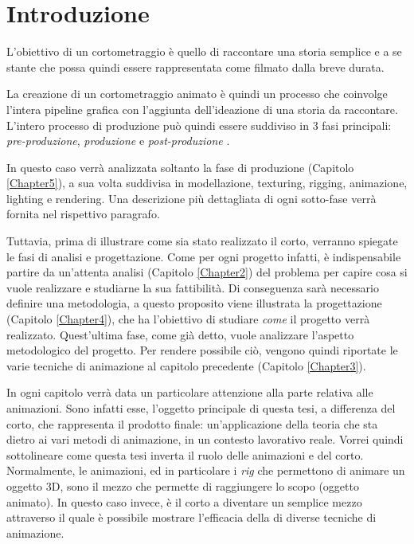 
\chapter{Introduzione} %

\label{Chapter1} %

L'obiettivo di un cortometraggio è quello di raccontare una storia semplice e a se stante che possa quindi essere rappresentata come filmato dalla breve durata.

La creazione di un cortometraggio animato è quindi un processo che coinvolge l'intera pipeline grafica con l'aggiunta dell'ideazione di una storia da raccontare. L'intero processo di produzione può quindi essere suddiviso in 3 fasi principali: \emph{pre-produzione}, \emph{produzione} e \emph{post-produzione} \parencite{roy2014finish}.

In questo caso verrà analizzata soltanto la fase di produzione (Capitolo \ref{Chapter5}), a sua volta suddivisa
in modellazione, texturing, rigging, animazione, lighting e rendering. Una descrizione più dettagliata di ogni
sotto-fase verrà fornita nel rispettivo paragrafo.

Tuttavia, prima di illustrare come sia stato realizzato il corto, verranno spiegate le fasi di analisi e
progettazione. Come per ogni progetto infatti, è indispensabile partire da un'attenta analisi (Capitolo \ref{Chapter2}) del problema per capire cosa si vuole realizzare e studiarne la sua fattibilità. Di conseguenza sarà necessario definire una metodologia, a questo proposito viene illustrata la progettazione (Capitolo \ref{Chapter4}), che ha l'obiettivo di studiare \emph{come} il progetto verrà realizzato.
Quest'ultima fase, come già detto, vuole analizzare l'aspetto metodologico del progetto. Per rendere possibile ciò, vengono quindi riportate le varie tecniche di animazione al capitolo precedente (Capitolo \ref{Chapter3}).

In ogni capitolo verrà data un particolare attenzione alla parte relativa alle animazioni. Sono infatti esse, l'oggetto principale di questa tesi, a differenza del corto, che rappresenta il prodotto finale: un'applicazione della teoria che sta dietro ai vari metodi di animazione, in un contesto lavorativo reale. Vorrei quindi sottolineare come questa tesi inverta il ruolo delle animazioni e del corto. Normalmente, le animazioni, ed in particolare i \emph{rig} che permettono di animare un oggetto 3D, sono il mezzo che permette di raggiungere lo scopo (oggetto animato). In questo caso invece, è il corto a diventare un semplice mezzo attraverso il quale è possibile mostrare l'efficacia della di diverse tecniche di animazione.




